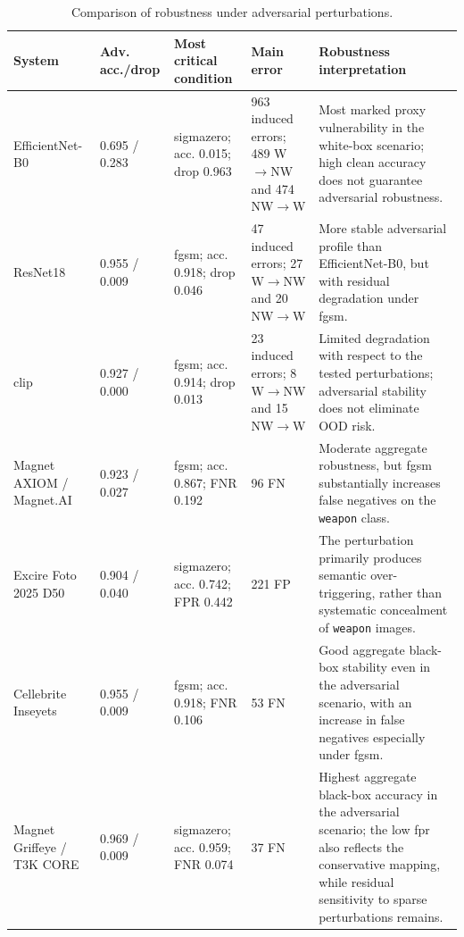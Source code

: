 \begin{table}[H]
\centering
\caption{Comparison of robustness under adversarial perturbations.}
\label{tab:results-comparative-adversarial}
\small
\renewcommand{\arraystretch}{1.18}
\setlength{\tabcolsep}{3pt}
\begin{tabularx}{\textwidth}{@{}p{2.7cm} p{1.8cm} p{3.1cm} p{2.8cm} X@{}}
\toprule
\textbf{System} &
\textbf{Adv. acc./drop} &
\textbf{Most critical condition} &
\textbf{Main error} &
\textbf{Robustness interpretation} \\
\midrule

EfficientNet-B0 &
0.695 / 0.283 &
\gls{sigmazero}; acc. 0.015; drop 0.963 &
963 induced errors; 489 W$\rightarrow$NW and 474 NW$\rightarrow$W &
Most marked proxy vulnerability in the white-box scenario; high clean accuracy
does not guarantee adversarial robustness. \\

ResNet18 &
0.955 / 0.009 &
\gls{fgsm}; acc. 0.918; drop 0.046 &
47 induced errors; 27 W$\rightarrow$NW and 20 NW$\rightarrow$W &
More stable adversarial profile than EfficientNet-B0, but with residual
degradation under \gls{fgsm}. \\

\gls{clip} &
0.927 / 0.000 &
\gls{fgsm}; acc. 0.914; drop 0.013 &
23 induced errors; 8 W$\rightarrow$NW and 15 NW$\rightarrow$W &
Limited degradation with respect to the tested perturbations; adversarial
stability does not eliminate OOD risk. \\

Magnet AXIOM / Magnet.AI &
0.923 / 0.027 &
\gls{fgsm}; acc. 0.867; FNR 0.192 &
96 FN &
Moderate aggregate robustness, but \gls{fgsm} substantially increases false
negatives on the \texttt{weapon} class. \\

Excire Foto 2025 D50 &
0.904 / 0.040 &
\gls{sigmazero}; acc. 0.742; FPR 0.442 &
221 FP &
The perturbation primarily produces semantic over-triggering, rather than
systematic concealment of \texttt{weapon} images. \\

Cellebrite Inseyets &
0.955 / 0.009 &
\gls{fgsm}; acc. 0.918; FNR 0.106 &
53 FN &
Good aggregate black-box stability even in the adversarial scenario, with an
increase in false negatives especially under \gls{fgsm}. \\

Magnet Griffeye / T3K CORE &
0.969 / 0.009 &
\gls{sigmazero}; acc. 0.959; FNR 0.074 &
37 FN &
Highest aggregate black-box accuracy in the adversarial scenario; the low
\gls{fpr} also reflects the conservative mapping, while residual sensitivity to
sparse perturbations remains. \\


\end{tabularx}
\end{table}
